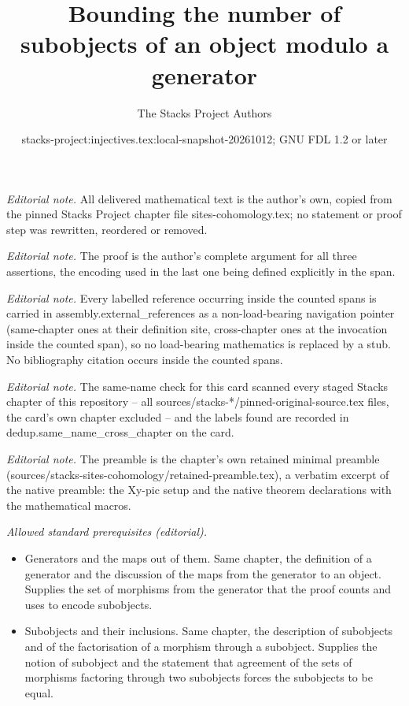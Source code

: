 \documentclass[10pt,a4paper]{amsart}
\title{Bounding the number of subobjects of an object modulo a generator}
\author{The Stacks Project Authors}
\date{stacks-project:injectives.tex:local-snapshot-20261012; GNU FDL 1.2 or later}
\theoremstyle{plain}
\theoremstyle{definition}
\theoremstyle{remark}
\numberwithin{equation}{subsection}
\begin{document}
\maketitle
\noindent\textit{Editorial note.} All delivered mathematical text is the author's own, copied from the pinned Stacks Project chapter file sites-cohomology.tex; no statement or proof step was rewritten, reordered or removed.\par\medskip
\noindent\textit{Editorial note.} The proof is the author's complete argument for all three assertions, the encoding used in the last one being defined explicitly in the span.\par\medskip
\noindent\textit{Editorial note.} Every labelled reference occurring inside the counted spans is carried in assembly.external\_references as a non-load-bearing navigation pointer (same-chapter ones at their definition site, cross-chapter ones at the invocation inside the counted span), so no load-bearing mathematics is replaced by a stub. No bibliography citation occurs inside the counted spans.\par\medskip
\noindent\textit{Editorial note.} The same-name check for this card scanned every staged Stacks chapter of this repository -- all sources/stacks-*/pinned-original-source.tex files, the card's own chapter excluded -- and the labels found are recorded in dedup.same\_name\_cross\_chapter on the card.\par\medskip
\noindent\textit{Editorial note.} The preamble is the chapter's own retained minimal preamble (sources/stacks-sites-cohomology/retained-preamble.tex), a verbatim excerpt of the native preamble: the Xy-pic setup and the native theorem declarations with the mathematical macros.\par\medskip
\noindent\textit{Allowed standard prerequisites (editorial).}\begin{itemize}
\item Generators and the maps out of them. Same chapter, the definition of a generator and the discussion of the maps from the generator to an object. Supplies the set of morphisms from the generator that the proof counts and uses to encode subobjects.
\item Subobjects and their inclusions. Same chapter, the description of subobjects and of the factorisation of a morphism through a subobject. Supplies the notion of subobject and the statement that agreement of the sets of morphisms factoring through two subobjects forces the subobjects to be equal.
\end{itemize}\medskip
\end{document}
